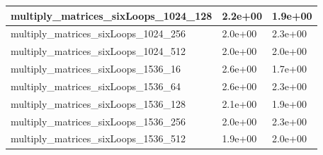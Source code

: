 \documentclass{scrartcl}
\begin{document}
\begin{table}[H]
\begin{tabular}{|l|l|l|}
multiply\_matrices\_sixLoops\_1024\_128 & 2.2e+00           & 1.9e+00            \\ \hline
multiply\_matrices\_sixLoops\_1024\_256 & 2.0e+00           & 2.3e+00            \\ \hline
multiply\_matrices\_sixLoops\_1024\_512 & 2.0e+00           & 2.0e+00            \\ \hline
multiply\_matrices\_sixLoops\_1536\_16  & 2.6e+00           & 1.7e+00            \\ \hline
multiply\_matrices\_sixLoops\_1536\_64  & 2.6e+00           & 2.3e+00            \\ \hline
multiply\_matrices\_sixLoops\_1536\_128 & 2.1e+00           & 1.9e+00            \\ \hline
multiply\_matrices\_sixLoops\_1536\_256 & 2.0e+00           & 2.3e+00            \\ \hline
multiply\_matrices\_sixLoops\_1536\_512 & 1.9e+00           & 2.0e+00            \\ \hline
\end{tabular}
\end{table}
\end{document}
